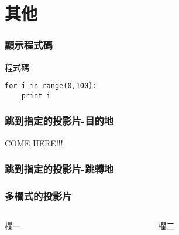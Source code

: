 \documentclass[xcolor=svgnames]{beamer}
\begin{document}
\section{其他}
\begin{frame}[fragile]
\frametitle{顯示程式碼}
\begin{block}{程式碼}
\begin{verbatim}
for i in range(0,100):
    print i
\end{verbatim}
\end{block}
\end{frame}
\begin{frame}[label=here]
\frametitle{跳到指定的投影片-目的地}
COME HERE!!!
\end{frame}
\begin{frame}
\frametitle{跳到指定的投影片-跳轉地}
\hyperlink{here}{}
\end{frame}
\begin{frame}
\frametitle{多欄式的投影片}
\begin{columns}
\begin{column}{5cm} %
欄一
\end{column}
\begin{column}{5cm} %
欄二
\end{column}
\end{columns}
\end{frame}
\end{document}
